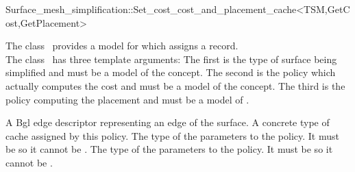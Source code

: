

\begin{ccRefClass}{Surface_mesh_simplification::Set_cost_cost_and_placement_cache<TSM,GetCost,GetPlacement>}


\ccDefinition

The class \ccRefName\ provides a model for
 which assigns a  record.\\
The class \ccRefName\ has three template arguments: The first is the type of surface
being simplified and must be a model of the  concept.
The second is the policy which actually computes the cost and must be a model
of the  concept. The third is the policy computing the placement
and must be a model of .

\ccIsModel
{}


\ccTypes
  \ccGlue
  {A {\sc Bgl} edge descriptor representing an edge of the surface.}
  \ccGlue
  {A concrete type of cache assigned by this policy.}
  \ccGlue
  {The type of the parameters to the  policy.
  It must be  so it cannot be .}
  \ccGlue
  {The type of the parameters to the   policy. 
  It must be  so it cannot be .} 
            

\end{ccRefClass}
